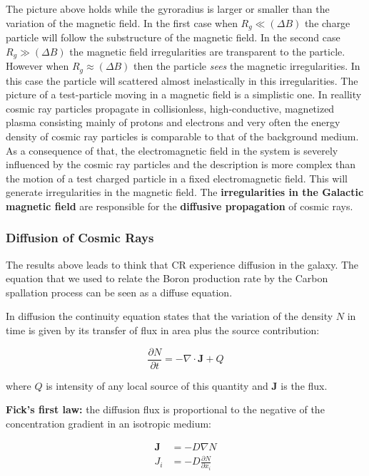 \documentclass[
  letterpaper,
  DIV=11,
  numbers=noendperiod]{scrreprt}
\begin{document}
The picture above holds while the gyroradius is larger or smaller than
the variation of the magnetic field. In the first case when
\(R_g \ll (\Delta B)\) the charge particle will follow the substructure
of the magnetic field. In the second case \(R_g \gg (\Delta B)\) the
magnetic field irregularities are transparent to the particle. However
when \(R_g \approx (\Delta B)\) then the particle \emph{sees} the
magnetic irregularities. In this case the particle will scattered almost
inelastically in this irregularities. The picture of a test-particle
moving in a magnetic field is a simplistic one. In reallity cosmic ray
particles propagate in collisionless, high-conductive, magnetized plasma
consisting mainly of protons and electrons and very often the energy
density of cosmic ray particles is comparable to that of the background
medium. As a consequence of that, the electromagnetic field in the
system is severely influenced by the cosmic ray particles and the
description is more complex than the motion of a test charged particle
in a fixed electromagnetic field. This will generate irregularities in
the magnetic field. The \textbf{irregularities in the Galactic magnetic
field} are responsible for the \textbf{diffusive propagation} of cosmic
rays.

\subsubsection{Diffusion of Cosmic Rays}\label{diffusion-of-cosmic-rays}

The results above leads to think that CR experience diffusion in the
galaxy. The equation that we used to relate the Boron production rate by
the Carbon spallation process can be seen as a diffuse equation.

In diffusion the continuity equation states that the variation of the
density \(N\) in time is given by its transfer of flux in area plus the
source contribution:

\[\frac{\partial N}{\partial t}= - \nabla \cdot \mathbf{J} + Q\]

where \(Q\) is intensity of any local source of this quantity and
\(\mathbf{J}\) is the flux.

\textbf{Fick's first law:} the diffusion flux is proportional to the
negative of the concentration gradient in an isotropic medium:

\[\begin{aligned}
\mathbf{J}&=-D \nabla N \\
J_i&=-D \frac{\partial N}{\partial x_i}
\end{aligned}\]
\end{document}
